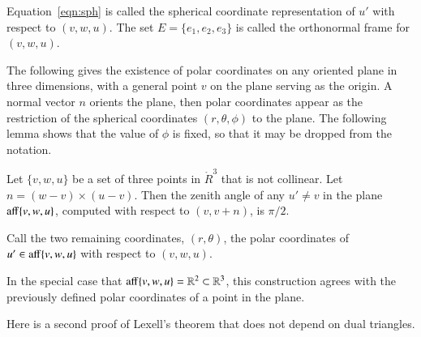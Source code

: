 \begin{definition}[frame]\label{def:sph}
Equation~\ref{eqn:sph} is called the spherical coordinate representation of
$u'$ with respect to $(v,w,u)$.  The set $E=\{e_1,e_2,e_3\}$ is called
the orthonormal frame for $(v,w,u)$.  
\end{definition}

The following gives the existence of polar coordinates on any oriented
plane in three dimensions, with a general point $v$ on the plane
serving as the origin.  A normal vector $n$  orients the plane,
then polar coordinates appear as the restriction of the
spherical coordinates $(r,\theta,\phi)$ to the plane.
The following lemma shows that the value of $\phi$ is fixed, so that
it may be dropped from the notation.

\begin{lemma}\label{lemma:polar-gen}
Let $\{v,w,u\}$ be a set of three points in $\ring{R}^3$
that is not collinear.
Let $n = (w-v) \times (u-v)$.
Then the zenith angle of any $u'\ne v$ in the plane ${\operatorname{aff}}\{v,w,u\}$,
computed with respect to $(v,v+n)$,
is $\pi/2$.
\end{lemma}

\begin{definition}\label{def:polar}
Call  the two remaining coordinates, $(r,\theta)$, 
the polar coordinates of $u'\in{\operatorname{aff}}\{v,w,u\}$ with
respect to $(v,w,u)$.
\end{definition}

In the special case that ${\operatorname{aff}}\{v,w,u\}=\mathbb{R}^2\subset \mathbb{R}^3$, this
construction agrees with the previously defined polar coordinates of a point in
the plane.

Here is a second proof of Lexell's theorem that does not depend on dual triangles.

